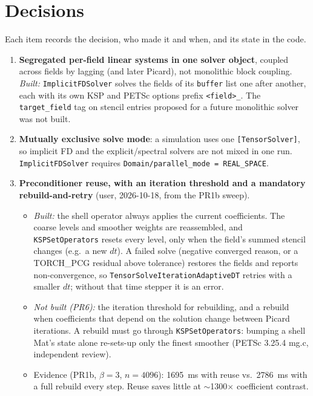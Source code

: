 \documentclass[11pt]{article}
\begin{document}
\section{Decisions}
\label{sec:decisions}

Each item records the decision, who made it and when, and its state in the
code.

\begin{enumerate}[leftmargin=*]
\item \textbf{Segregated per-field linear systems in one solver object},
coupled across fields by lagging (and later Picard), not monolithic block
coupling. \emph{Built:} \texttt{ImplicitFDSolver} solves the fields of its
\texttt{buffer} list one after another, each with its own KSP and PETSc
options prefix \texttt{<field>\_}. The \texttt{target\_field} tag on stencil
entries proposed for a future monolithic solver was not built.
\item \textbf{Mutually exclusive solve mode}: a simulation uses one
\texttt{[TensorSolver]}, so implicit FD and the explicit/spectral solvers
are not mixed in one run. \texttt{ImplicitFDSolver} requires
\texttt{Domain/parallel\_mode = REAL\_SPACE}.
\item \textbf{Preconditioner reuse, with an iteration threshold and a
mandatory rebuild-and-retry} (user, 2026-10-18, from the PR1b sweep).
\begin{itemize}
\item \emph{Built:} the shell operator always applies the current
coefficients. The coarse levels and smoother weights are reassembled, and
\texttt{KSPSetOperators} resets every level, only when the field's summed
stencil changes (e.g.\ a new $dt$). A failed solve (negative converged
reason, or a TORCH\_PCG residual above tolerance) restores the fields and
reports non-convergence, so \texttt{TensorSolveIterationAdaptiveDT} retries
with a smaller $dt$; without that time stepper it is an error.
\item \emph{Not built (PR6):} the iteration threshold for rebuilding, and a
rebuild when coefficients that depend on the solution change between Picard
iterations. A rebuild must go through \texttt{KSPSetOperators}: bumping a
shell Mat's state alone re-sets-up only the finest smoother (PETSc 3.25.4
mg.c, independent review).
\item Evidence (PR1b, $\beta=3$, $n=4096$): 1695~ms with reuse vs.\ 2786~ms
with a full rebuild every step. Reuse saves little at $\sim$1300$\times$
coefficient contrast.
\end{itemize}

\end{enumerate}
\end{document}
